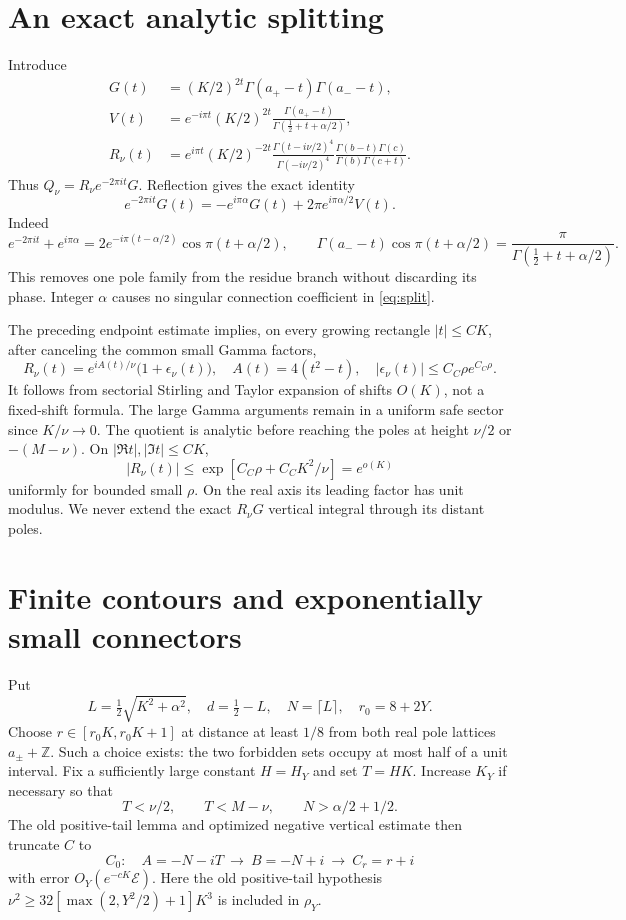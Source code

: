\documentclass[11pt,a4paper]{article}
\newcommand{\E}{\mathcal E}
\begin{document}
\section{An exact analytic splitting}
Introduce
\begin{align*}
 G(t)&=(K/2)^{2t}\Gamma(a_+-t)\Gamma(a_--t),\\
 V(t)&=e^{-i\pi t}(K/2)^{2t}
       \frac{\Gamma(a_+-t)}{\Gamma(\tfrac12+t+\alpha/2)},\\
 R_\nu(t)&=e^{i\pi t}(K/2)^{-2t}
 \frac{\Gamma(t-i\nu/2)^4}{\Gamma(-i\nu/2)^4}
 \frac{\Gamma(b-t)\Gamma(c)}{\Gamma(b)\Gamma(c+t)}.
\end{align*}
Thus \(Q_\nu=R_\nu e^{-2\pi it}G\). Reflection gives the exact identity
\begin{equation}\label{eq:split}
 e^{-2\pi it}G(t)=-e^{i\pi\alpha}G(t)
                   +2\pi e^{i\pi\alpha/2}V(t).
\end{equation}
Indeed
\[
 e^{-2\pi it}+e^{i\pi\alpha}
 =2e^{-i\pi(t-\alpha/2)}\cos\pi(t+\alpha/2),
 \qquad
 \Gamma(a_--t)\cos\pi(t+\alpha/2)
 =\frac{\pi}{\Gamma(\tfrac12+t+\alpha/2)}.
\]
This removes one pole family from the residue branch without
discarding its phase. Integer \(\alpha\) causes no singular
connection coefficient in \eqref{eq:split}.

The preceding endpoint estimate implies, on every growing rectangle
\(|t|\le CK\), after canceling the common small Gamma factors,
\begin{equation}\label{eq:mult}
 R_\nu(t)=e^{iA(t)/\nu}\bigl(1+\epsilon_\nu(t)\bigr),\quad
 A(t)=4(t^2-t),\quad
 |\epsilon_\nu(t)|\le C_C\rho e^{C_C\rho}.
\end{equation}
It follows from sectorial Stirling and Taylor expansion of shifts
\(O(K)\), not a fixed-shift formula. The large Gamma arguments remain
in a uniform safe sector since \(K/\nu\to0\).
The quotient is analytic before reaching the poles at height \(\nu/2\)
or \(-(M-\nu)\). On \(|\Re t|,|\Im t|\le CK\),
\[
 |R_\nu(t)|\le\exp[C_C\rho+C_CK^2/\nu]=e^{o(K)}
\]
uniformly for bounded small \(\rho\). On the real axis its leading
factor has unit modulus. We never extend the exact \(R_\nu G\)
vertical integral through its distant poles.

\section{Finite contours and exponentially small connectors}
Put
\[
 L=\tfrac12\sqrt{K^2+\alpha^2},\quad d=\tfrac12-L,\quad
 N=\lceil L\rceil,\quad r_0=8+2Y.
\]
Choose \(r\in[r_0K,r_0K+1]\) at distance at least \(1/8\)
from both real pole lattices \(a_\pm+\mathbb Z\).
Such a choice exists: the two forbidden sets occupy at most
half of a unit interval. Fix a sufficiently large constant \(H=H_Y\)
and set \(T=HK\). Increase \(K_Y\) if necessary so that
\[
 T<\nu/2,\qquad T<M-\nu,\qquad N>\alpha/2+1/2.
\]
The old positive-tail lemma and optimized negative vertical estimate
then truncate \(C\) to
\[
 C_0:\quad A=-N-iT\ \longrightarrow\
 B=-N+i\ \longrightarrow\ C_r=r+i
\]
with error \(O_Y(e^{-cK}\E)\).
Here the old positive-tail hypothesis
\(\nu^2\ge32[\max(2,Y^2/2)+1]K^3\) is included in \(\rho_Y\).
\end{document}
